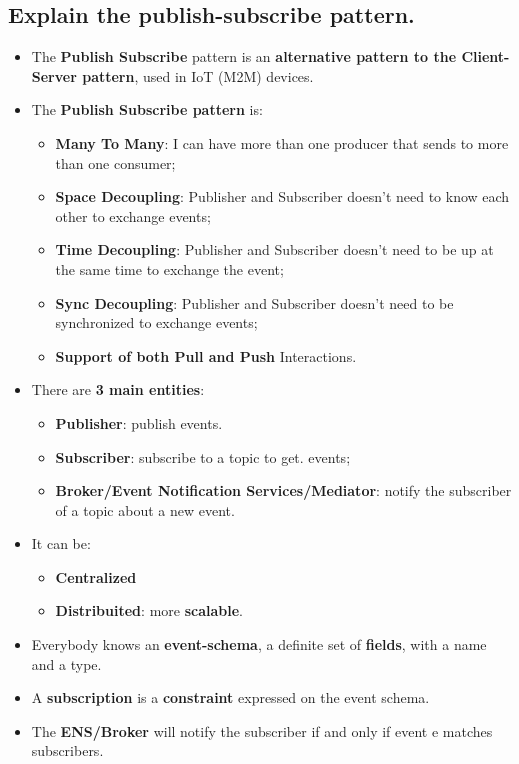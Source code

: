 \documentclass[9pt, letterpaper]{article}
\begin{document}
\subsection{Explain the publish-subscribe pattern.}
\begin{itemize}
	\item The \textbf{Publish Subscribe} pattern is an \textbf{alternative pattern to the Client-Server pattern}, used in IoT (M2M) devices.
	\item The \textbf{Publish Subscribe pattern} is:
	\begin{itemize}
		\item \textbf{Many To Many}: I can have more than one producer that sends to more than one consumer;
		\item \textbf{Space Decoupling}: Publisher and Subscriber doesn't need to know each other to exchange events;
		\item \textbf{Time Decoupling}: Publisher and Subscriber doesn't need to be up at the same time to exchange the event;
		\item \textbf{Sync Decoupling}: Publisher and Subscriber doesn't need to be synchronized to exchange events;
		\item \textbf{Support of both Pull and Push} Interactions.
	\end{itemize}
	\item There are \textbf{3 main entities}:
	\begin{itemize}
		\item \textbf{Publisher}: publish events.
		\item \textbf{Subscriber}: subscribe to a topic to get. events;
		\item \textbf{Broker/Event Notification Services/Mediator}: notify the subscriber of a topic about a new event.
	\end{itemize}
	\item It can be:
	\begin{itemize}
		\item \textbf{Centralized}
		\item \textbf{Distribuited}: more \textbf{scalable}.
	\end{itemize}
	\item Everybody knows an \textbf{event-schema}, a definite set of \textbf{fields}, with a name and a type.
	\item A \textbf{subscription} is a \textbf{constraint} expressed on the event schema.
	\item The \textbf{ENS/Broker} will notify the subscriber if and only if event e matches subscribers.

\end{itemize}
\end{document}

